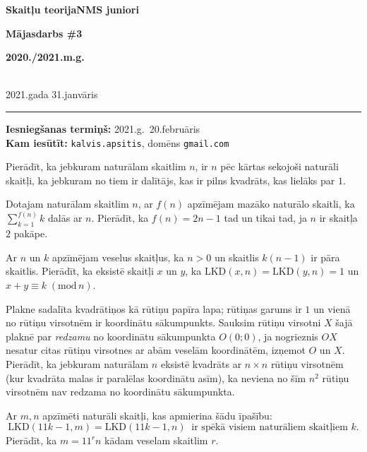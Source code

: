 \documentclass[a4paper,12pt]{article}
\begin{document}
\begin{center}
\parbox{3.5cm}{\flushleft\bf Skaitļu teorija\linebreak NMS juniori} \hfill {\bf\LARGE Mājasdarbs \#3} \hfill \parbox{3.5cm}{\flushright\bf 2020./2021.m.g.} \\[2pt]
\rm\small 2021.gada 31.janvāris
\end{center}

\hrule

\vspace{10pt}
{\bf Iesniegšanas termiņš:} 2021.g.\ 20.februāris\\
{\bf Kam iesūtīt:} {\tt kalvis.apsitis}, domēns {\tt gmail.com}

\vspace{10pt}
\begin{problem}
Pierādīt, ka jebkuram naturālam skaitlim $n$, ir $n$ pēc kārtas sekojoši 
naturāli skaitļi, ka jebkuram no tiem ir dalītājs, kas ir pilns kvadrāts, kas lielāks par $1$. 
\end{problem}

\vspace{10pt}
\begin{problem}
Dotajam naturālam skaitlim $n$, ar $f(n)$ apzīmējam mazāko naturālo skaitli, ka 
${\displaystyle \sum\limits_{k=1}^{f(n)} k}$ dalās ar $n$. 
Pierādīt, ka $f(n) = 2n-1$ tad un tikai tad, ja $n$ ir skaitļa $2$ pakāpe.
\end{problem}

\vspace{10pt}
\begin{problem}
Ar $n$ un $k$ apzīmējam veselus skaitļus, ka $n>0$ un skaitlis $k(n-1)$ ir pāra skaitlis. 
Pierādīt, ka eksistē skaitļi $x$ un $y$, ka $\text{LKD}(x,n) = \text{LKD}(y,n) = 1$ un 
$x + y \equiv k\;(\text{mod}\,n)$. 
\end{problem}

\vspace{10pt}
\begin{problem}
Plakne sadalīta kvadrātiņos kā rūtiņu papīra lapa; rūtiņas garums ir $1$ un vienā no rūtiņu 
virsotnēm ir koordinātu sākumpunkts.
Sauksim rūtiņu virsotni $X$ šajā plaknē par {\em redzamu} no koordinātu sākumpunkta 
$O(0;0)$, ja nogrieznis $OX$ nesatur citas rūtiņu virsotnes ar abām veselām koordinātēm, 
izņemot $O$ un $X$. Pierādīt, ka jebkuram naturālam $n$ eksistē kvadrāts ar $n \times n$ rūtiņu virsotnēm
(kur kvadrāta malas ir paralēlas koordinātu asīm), 
ka neviena no šīm $n^2$ rūtiņu virsotnēm nav redzama no koordinātu sākumpunkta.
\end{problem}

\vspace{10pt}
\begin{problem}
Ar $m, n$ apzīmēti naturāli skaitļi, kas apmierina šādu īpašību:
$$ \text{LKD}(11k-1,m) = \text{LKD}(11k-1,n)\;\;\text{ir spēkā visiem naturāliem skaitļiem $k$.}$$
Pierādīt, ka $m = 11^rn$ kādam veselam skaitlim $r$. 
\end{problem}
\end{document}
